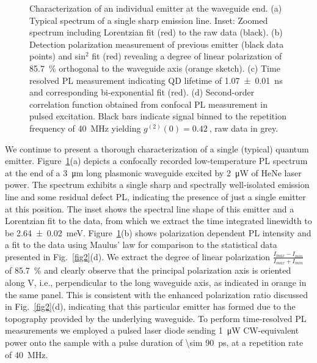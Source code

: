 \documentclass[journal=nalefd,manuscript=letter]{achemso}
\newcommand{\onecolfigurescale}{1.5}
\begin{document}
\begin{figure}[!ht]
\scalebox{\onecolfigurescale}{\texttt{[image: fig3.pdf]}}
\renewcommand{\figurename}{Figure}
\caption{\label{fig3}
%
Characterization of an individual emitter at the waveguide end.
(a) Typical spectrum of a single sharp emission line. Inset: Zoomed spectrum including Lorentzian fit (red) to the raw data (black). (b) Detection polarization measurement of previous emitter (black data points) and sin$^2$ fit (red) revealing a degree of linear polarization of \SI{85.7}{\percent} orthogonal to the waveguide axis (orange sketch).
(c) Time resolved PL measurement indicating QD lifetime of \SI{1.07 \pm 0.01}{\nano\second} and corresponding bi-exponential fit (red).
(d) Second-order correlation function obtained from confocal PL measurement in pulsed excitation. Black bars indicate signal binned to the repetition frequency of \SI{40}{\mega\hertz} yielding $g^{(2)}(0) = \SI{0.42}{}$, raw data in grey.
}
\end{figure}
We continue to present a thorough characterization of a single (typical) quantum emitter.
Figure~\ref{fig3}(a) depicts a confocally recorded low-temperature PL spectrum at the end of a \SI{3}{\micro\meter} long plasmonic waveguide excited by \SI{2}{\micro\watt} of HeNe laser power.
The spectrum exhibits a single sharp and spectrally well-isolated emission line and some residual defect PL, indicating the presence of just a single emitter at this position.
The inset shows the spectral line shape of this emitter and a Lorentzian fit to the data, from which we extract the time integrated linewidth to be \SI{2.64 \pm 0.02}{\milli\electronvolt}.
Figure~\ref{fig3}(b) shows polarization dependent PL intensity and a fit to the data using Maulus' law for comparison to the statistical data presented in Fig.~\ref{fig2}(d).
We extract the degree of linear polarization $\frac{I_{max}-I_{min}}{I_{max}+I_{min}}$ of \SI{85.7}{\percent} and clearly observe that the principal polarization axis is oriented along V, i.e., perpendicular to the long waveguide axis, as indicated in orange in the same panel.
This is consistent with the enhanced polarization ratio discussed in Fig.~\ref{fig2}(d), indicating that this particular emitter has formed due to the topography provided by the underlying waveguide.
To perform time-resolved PL measurements we employed a pulsed laser diode sending \SI{1}{\micro\watt} CW-equivalent power onto the sample with a pulse duration of \SI{\sim 90}{\pico\second}, at a repetition rate of \SI{40}{\mega\hertz}.
\end{document}
